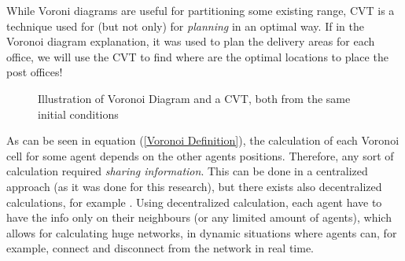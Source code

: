 \documentclass{iacas}
\begin{document}
While Voroni diagrams are useful for partitioning some existing range, CVT is a technique used for (but not only) for \textit{planning} in an optimal way. If in the Voronoi diagram explanation, it was used to plan the delivery areas for each office, we will use the CVT to find where are the optimal locations to place the post offices!

\begin{figure}
	\captionsetup[subfigure]{position=b}
	\centering
	\caption{Illustration of Voronoi Diagram and a CVT, both from the same initial conditions}
\label{fig:Voronoi_tessellation_illustration}
\end{figure}

As can be seen in equation (\ref{Voronoi Definition}), the calculation of each Voronoi cell for some agent depends on the other agents positions. Therefore, any sort of calculation required \emph{sharing information}. This can be done in a centralized approach (as it was done for this research), but there exists also decentralized calculations, for example \cite{Adams2009}. Using decentralized calculation, each agent have to have the info only on their neighbours (or any limited amount of agents), which allows for calculating huge networks, in dynamic situations where agents can, for example, connect and disconnect from the network in real time.
\end{document}
